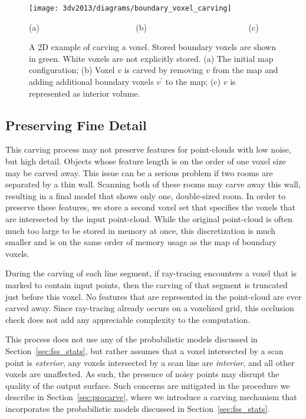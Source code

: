 \documentclass[12pt,onecolumn,oneside]{book}
\begin{document}
\begin{figure}[t]

  \centerline{\texttt{[image: 3dv2013/diagrams/boundary\_voxel\_carving]}}
  \centerline{(a)\,\,\,\,\,\,\,\,\,\,\,\,\,\,\,\,\,\,\,\,\,\,\,\,\,\,\,\,\,\,\,\,\,\,\,\,\,\,\,\,\,\,\,\,\,\,\,\,\,\,\,\,\,\,\,\,\,\,\,\,\,\,\,\,\,\,\,\,\,\,(b)\,\,\,\,\,\,\,\,\,\,\,\,\,\,\,\,\,\,\,\,\,\,\,\,\,\,\,\,\,\,\,\,\,\,\,\,\,\,\,\,\,\,\,\,\,\,\,\,\,\,\,\,\,\,\,\,\,\,\,\,\,\,\,\,\,\,\,\,\,\,\,\,\,\,(c)\,\,\,\,\,}
\caption[A 2D example of carving a voxel.]{A 2D example of carving a voxel.  Stored boundary voxels are shown in green.  White voxels are not explicitly stored. (a) The initial map configuration; (b) Voxel $v$ is carved by removing $v$ from the map and adding additional boundary voxels $v^{\prime}$ to the map; (c) $v$ is represented as interior volume.}
\label{fig:dgrid_boundary_carving}
\end{figure}

\subsection{Preserving Fine Detail}
\label{ssec:voxel_carving_preserving_detail}

This carving process may not preserve features for point-clouds with low noise, but high detail.  Objects whose feature length is on the order of one voxel size may be carved away.  This issue can be a serious problem if two rooms are separated by a thin wall.  Scanning both of these rooms may carve away this wall, resulting in a final model that shows only one, double-sized room.  In order to preserve these features, we store a second voxel set that specifies the voxels that are intersected by the input point-cloud.  While the original point-cloud is often much too large to be stored in memory at once, this discretization is much smaller and is on the same order of memory usage as the map of boundary voxels.

During the carving of each line segment, if ray-tracing encounters a voxel that is marked to contain input points, then the carving of that segment is truncated just before this voxel.  No features that are represented in the point-cloud are ever carved away.  Since ray-tracing already occurs on a voxelized grid, this occlusion check does not add any appreciable complexity to the computation.

This process does not use any of the probabilistic models discussed in Section~\ref{sec:fss_stats}, but rather assumes that a voxel intersected by a scan point is {\it exterior}, any voxels intersected by a scan line are {\it interior}, and all other voxels are unaffected.  As such, the presence of noisy points may disrupt the quality of the output surface.  Such concerns are mitigated in the procedure we describe in Section~\ref{sec:procarve}, where we introduce a carving mechanism that incorporates the probabilistic models discussed in Section~\ref{sec:fss_stats}.
\end{document}
